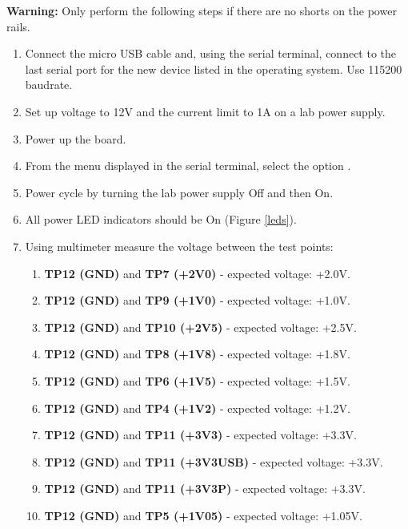 \documentclass[12pt,oneside,a4]{article}
\begin{document}
\textbf{Warning:} Only perform the following steps if there are no shorts on the power rails.
\begin{enumerate}
    \item Connect the micro USB cable and, using the serial terminal, connect to the last serial port for the new device listed in the operating system. Use 115200 baudrate.
    \item Set up voltage to 12V and the current limit to 1A on a lab power supply.
    \item Power up the board.
    \item From the menu displayed in the serial terminal, select the option .
    \item Power cycle by turning the lab power supply Off and then On.
    \item All power LED indicators should be On (Figure \ref{leds}).
    \item Using multimeter measure the voltage between the test points:
    \begin{enumerate}
    	\item \textbf{TP12 (GND)} and \textbf{TP7 (+2V0)} - expected voltage: +2.0V.
    	\item \textbf{TP12 (GND)} and \textbf{TP9 (+1V0)} - expected voltage: +1.0V.
    	\item \textbf{TP12 (GND)} and \textbf{TP10 (+2V5)} - expected voltage: +2.5V.
    	\item \textbf{TP12 (GND)} and \textbf{TP8 (+1V8)} - expected voltage: +1.8V.
    	\item \textbf{TP12 (GND)} and \textbf{TP6 (+1V5)} - expected voltage: +1.5V.
    	\item \textbf{TP12 (GND)} and \textbf{TP4 (+1V2)} - expected voltage: +1.2V.
    	\item \textbf{TP12 (GND)} and \textbf{TP11 (+3V3)} - expected voltage: +3.3V.
    	\item \textbf{TP12 (GND)} and \textbf{TP11 (+3V3USB)} - expected voltage: +3.3V.
    	\item \textbf{TP12 (GND)} and \textbf{TP11 (+3V3P)} - expected voltage: +3.3V.
    	\item \textbf{TP12 (GND)} and \textbf{TP5 (+1V05)} - expected voltage: +1.05V.
\end{enumerate}
\end{enumerate}
\end{document}
